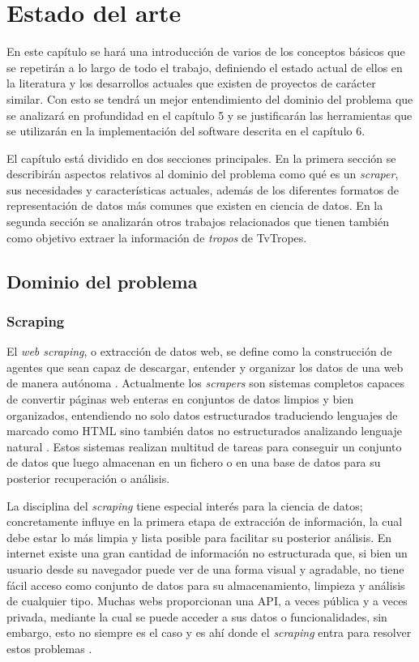 \chapter{Estado del arte}

En este capítulo se hará una introducción de varios de los conceptos básicos que
se repetirán a lo largo de todo el trabajo, definiendo el estado actual de ellos
en la literatura y los desarrollos actuales que existen de proyectos de carácter
similar. Con esto se tendrá un mejor entendimiento del dominio del problema que
se analizará en profundidad en el capítulo 5 y se justificarán las herramientas
que se utilizarán en la implementación del software descrita en el capítulo 6.

El capítulo está dividido en dos secciones principales. En la primera sección se
describirán aspectos relativos al dominio del problema como qué es un
\textit{scraper}, sus necesidades y características actuales, además de los
diferentes formatos de representación de datos más comunes que existen en
ciencia de datos. En la segunda sección se analizarán otros trabajos
relacionados que tienen también como objetivo extraer la información de
\textit{tropos} de TvTropes. 

\section{Dominio del problema}
\subsection{Scraping}
El \textit{web scraping}, o extracción de datos web, se define como la
construcción de agentes que sean capaz de descargar, entender y organizar los
datos de una web de manera autónoma \cite{apress2018scraping}. Actualmente los \textit{scrapers} son sistemas completos capaces de convertir páginas web enteras en conjuntos de datos limpios y bien organizados, entendiendo no solo datos estructurados traduciendo lenguajes de marcado como HTML sino también datos no estructurados analizando lenguaje natural \cite{zhao2017web}. Estos sistemas realizan multitud de tareas para conseguir un conjunto de datos que luego almacenan en un fichero o en una base de datos para su posterior recuperación o análisis.

La disciplina del \textit{scraping} tiene especial interés para la ciencia de
datos; concretamente influye en la primera etapa de extracción de información,
la cual debe estar lo más limpia y lista posible para facilitar su posterior
análisis. En internet existe una gran cantidad de información no estructurada
que, si bien un usuario desde su navegador puede ver de una forma visual y
agradable, no tiene fácil acceso como conjunto de datos para su almacenamiento,
limpieza y análisis de cualquier tipo. Muchas webs proporcionan una API, a veces
pública y a veces privada, mediante la cual se puede acceder a sus datos o
funcionalidades, sin embargo, esto no siempre es el caso y es ahí donde el
\textit{scraping} entra para resolver estos problemas \cite{apress2018scraping}.

